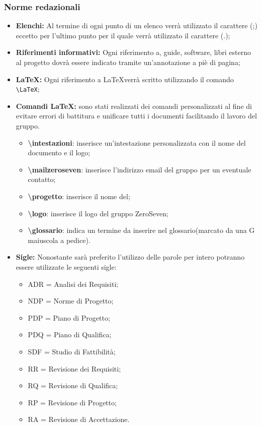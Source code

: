 \subsubsection{Norme redazionali} 

\begin{itemize}
	\item \textbf{Elenchi:} Al termine di ogni punto di un elenco verrà utilizzato il carattere (;) eccetto per l'ultimo punto per il quale verrà utilizzato il carattere (.);
	\item \textbf{Riferimenti informativi:} Ogni riferimento a, guide, software,
	libri esterno al progetto dovrà essere indicato tramite un’annotazione a piè di pagina;
	\item \textbf{\LaTeX:} Ogni riferimento a \LaTeX verrà scritto utilizzando il comando \texttt{\textbackslash LaTeX};
	\item \textbf{Comandi \LaTeX:} sono stati realizzati dei comandi personalizzati al fine di evitare errori di battitura e unificare tutti i documenti facilitando il lavoro del gruppo.
	\begin{itemize}
		\item \textbf{ \textbackslash intestazioni}: inserisce un'intestazione personalizzata con il nome del documento e il logo;
		\item \textbf{ \textbackslash mailzeroseven}: inserisce l'indirizzo email del gruppo per un eventuale contatto;
		\item \textbf{ \textbackslash progetto}: inserisce il nome del;
		\item \textbf{ \textbackslash logo}: inserisce il logo del gruppo ZeroSeven;
		\item \textbf{ \textbackslash glossario}: indica un termine da inserire nel glossario(marcato da una G maiuscola a pedice).	
	\end{itemize}
	
	\item \textbf{Sigle:} Nonostante sarà preferito l'utilizzo delle parole per intero potranno essere utilizzate le seguenti sigle:
	\begin{itemize}
	\item ADR = Analisi dei Requisiti;
	\item NDP = Norme di Progetto;
	\item PDP = Piano di Progetto;
	\item PDQ = Piano di Qualifica;
	\item SDF = Studio di Fattibilità;
	\item RR = Revisione dei Requisiti;
	\item RQ = Revisione di Qualifica;
	\item RP = Revisione di Progetto;
	\item RA = Revisione di Accettazione.
	\end{itemize}
\end{itemize}
